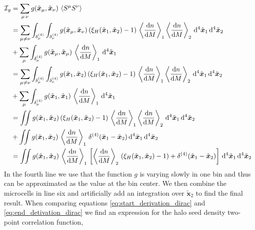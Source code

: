 \documentclass[../main.tex]{subfiles}
\begin{document}
\begin{align}
    \mathcal{I}_g &= \sum_{\mu\,\nu} g(\tilde{\boldsymbol{x}}_\mu,\tilde{\boldsymbol{x}}_\nu)\,\left\langle S^\mu S^\nu \right\rangle\\
     &= \sum_{\mu \neq \nu} \int_{\delta^{(4)}_\mu}\int_{\delta^{(4)}_\nu}g(\tilde{\boldsymbol{x}}_\mu,\tilde{\boldsymbol{x}}_\nu)\,( \xi_H(\tilde{\boldsymbol{x}}_1,\tilde{\boldsymbol{x}}_2) -1 )\,\left\langle \frac{\mathrm{d} n}{\mathrm{d} M} \right\rangle_1 \left\langle \frac{\mathrm{d} n}{\mathrm{d} M} \right\rangle_2 \,\mathrm{d}^4 \tilde{\boldsymbol{x}}_1\,\mathrm{d}^4 \tilde{\boldsymbol{x}}_2\nonumber\\
     &+ \sum_{\mu}  \int_{\delta^{(4)}_\mu} g(\tilde{\boldsymbol{x}}_\mu,\tilde{\boldsymbol{x}}_\mu)\,\left\langle \frac{\mathrm{d} n}{\mathrm{d} M} \right\rangle_1\,\mathrm{d}^4 \tilde{\boldsymbol{x}}_1\\
     &= \sum_{\mu \neq \nu} \int_{\delta^{(4)}_\mu}\int_{\delta^{(4)}_\nu}g(\tilde{\boldsymbol{x}}_1,\tilde{\boldsymbol{x}}_2)\,( \xi_H(\tilde{\boldsymbol{x}}_1,\tilde{\boldsymbol{x}}_2) -1 )\,\left\langle \frac{\mathrm{d} n}{\mathrm{d} M} \right\rangle_1 \left\langle \frac{\mathrm{d} n}{\mathrm{d} M} \right\rangle_2 \,\mathrm{d}^4 \tilde{\boldsymbol{x}}_1\,\mathrm{d}^4 \tilde{\boldsymbol{x}}_2\nonumber\\
     &+ \sum_{\mu}  \int_{\delta^{(4)}_\mu} g(\tilde{\boldsymbol{x}}_1,\tilde{\boldsymbol{x}}_1)\,\left\langle \frac{\mathrm{d} n}{\mathrm{d} M} \right\rangle_1\,\mathrm{d}^4 \tilde{\boldsymbol{x}}_1\\
     &= \iint g(\tilde{\boldsymbol{x}}_1,\tilde{\boldsymbol{x}}_2)\,( \xi_H(\tilde{\boldsymbol{x}}_1,\tilde{\boldsymbol{x}}_2) -1 )\,\left\langle \frac{\mathrm{d} n}{\mathrm{d} M} \right\rangle_1 \left\langle \frac{\mathrm{d} n}{\mathrm{d} M} \right\rangle_2 \,\mathrm{d}^4 \tilde{\boldsymbol{x}}_1\,\mathrm{d}^4 \tilde{\boldsymbol{x}}_2\nonumber\\
     &+ \iint g(\tilde{\boldsymbol{x}}_1,\tilde{\boldsymbol{x}}_2)\,\left\langle \frac{\mathrm{d} n}{\mathrm{d} M} \right\rangle_1\,\delta^{(4)}(\tilde{\boldsymbol{x}}_1-\tilde{\boldsymbol{x}}_2)\,\mathrm{d}^4 \tilde{\boldsymbol{x}}_1\,\mathrm{d}^4 \tilde{\boldsymbol{x}}_2\\
     &= \iint g(\tilde{\boldsymbol{x}}_1,\tilde{\boldsymbol{x}}_2)\,\left\langle \frac{\mathrm{d} n}{\mathrm{d} M} \right\rangle_1\,\left[\left\langle \frac{\mathrm{d} n}{\mathrm{d} M} \right\rangle_2\,( \xi_H(\tilde{\boldsymbol{x}}_1,\tilde{\boldsymbol{x}}_2) -1 )+\delta^{(4)}(\tilde{\boldsymbol{x}}_1-\tilde{\boldsymbol{x}}_2)\right]\,\mathrm{d}^4\tilde{\boldsymbol{x}}_1\,\mathrm{d}^4\tilde{\boldsymbol{x}}_2 \label{eq:end_detivation_dirac}
\end{align}
In the fourth line we use that the function $g$ is varying slowly in one bin and thus can be approximated as the value at the bin center. We then combine the microcells in line six and artificially add an integration over $\tilde{\boldsymbol{x}}_2$ to find the final result. When comparing equations \ref{eq:start_derivation_dirac} and \ref{eq:end_detivation_dirac} we find an expression for the halo seed density two-point correlation function, 
\end{document}
